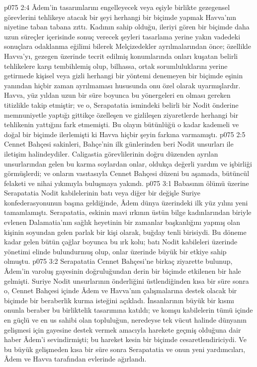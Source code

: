 \vs p075 2:4 Âdem’in tasarımlarını engelleyecek veya eşiyle birlikte gezegensel görevlerini tehlikeye atacak bir şeyi herhangi bir biçimde yapmak Havva’nın niyetine taban tabana zıttı. Kadının sahip olduğu, ileriyi gören bir biçimde daha uzun süreçler içerisinde sonuç verecek şeyleri tasarlama yerine yakın vadedeki sonuçlara odaklanma eğilimi bilerek Melçizedekler ayrılmalarından önce; özellikle Havva’yı, gezegen üzerinde tecrit edilmiş konumlarında onları kuşatan belirli tehlikelere karşı tembihlemiş olup, bilhassa, ortak sorumluluklarını yerine getirmede kişisel veya gizli herhangi bir yöntemi denemeyen bir biçimde eşinin yanından hiçbir zaman ayrılmaması hususunda onu özel olarak uyarmışlardır. Havva, yüz yıldan uzun bir süre boyunca bu yönergeleri en olması gereken titizlikle takip etmiştir; ve o, Serapatatia ismindeki belirli bir Nodit önderine memnuniyetle yaptığı gittikçe özelleşen ve gizlileşen ziyaretlerde herhangi bir tehlikenin yattığını fark etmemişti. Bu olayın bütünlüğü o kadar kademeli ve doğal bir biçimde ilerlemişti ki Havva hiçbir şeyin farkına varmamıştı.
\vs p075 2:5 Cennet Bahçesi sakinleri, Bahçe’nin ilk günlerinden beri Nodit unsurları ile iletişim halindeydiler. Caligastia görevlilerinin doğru düzenden ayrılan unsurlarından gelen bu karma soylardan onlar, oldukça değerli yardım ve işbirliği görmüşlerdi; ve onların vasıtasıyla Cennet Bahçesi düzeni bu aşamada, bütüncül felaketi ve nihai yıkımıyla buluşmaya yakındı.
\vs p075 3:1 Babasının ölümü üzerine Serapatatia Nodit kabilelerinin batı veya diğer bir değişle Suriye konfederasyonunun başına geldiğinde, Âdem dünya üzerindeki ilk yüz yılını yeni tamamlamıştı. Serapatatia, eskinin mavi ırkının üstün bilge kadınlarından biriyle evlenen Dalamatia’nın sağlık heyetinin bir zamanlar başkanlığını yapmış olan kişinin soyundan gelen parlak bir kişi olarak, buğday tenli birisiydi. Bu döneme kadar gelen bütün çağlar boyunca bu ırk kolu; batı Nodit kabileleri üzerinde yönetimi elinde bulundurmuş olup, onlar üzerinde büyük bir etkiye sahip olmuştu.
\vs p075 3:2 Serapatatia Cennet Bahçesi’ne birkaç ziyarette bulunup, Âdem’in varoluş gayesinin doğruluğundan derin bir biçimde etkilenen bir hale gelmişti. Suriye Nodit unsurlarının önderliğini üstlendiğinden kısa bir süre sonra o, Cennet Bahçesi içinde Âdem ve Havva’nın çalışmalarına destek olacak bir biçimde bir beraberlik kurma isteğini açıkladı. İnsanlarının büyük bir kısmı onunla beraber bu birliktelik tasarımına katıldı; ve komşu kabilelerin tümü içinde en güçlü ve en us sahibi olan topluluğun, neredeyse tek vücut halinde dünyanın gelişmesi için gayesine destek vermek amacıyla harekete geçmiş olduğuna dair haber Âdem’i sevindirmişti; bu hareket kesin bir biçimde cesaretlendiriciydi. Ve bu büyük gelişmeden kısa bir süre sonra Serapatatia ve onun yeni yardımcıları, Âdem ve Havva tarafından evlerinde ağırlandı.
